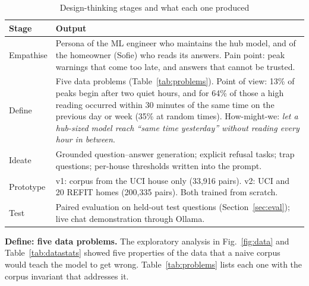 \documentclass[conference]{IEEEtran}
\begin{document}
\begin{table}[t]
\caption{Design-thinking stages and what each one produced}
\label{tab:dt}
\centering
\footnotesize
\begin{tabular}{@{}p{1.45cm}p{6.95cm}@{}}
\toprule
Stage & Output \\
\midrule
Empathise & Persona of the ML engineer who maintains the hub model, and of the homeowner (Sofie) who reads its answers. Pain point: peak warnings that come too late, and answers that cannot be trusted. \\
Define & Five data problems (Table~\ref{tab:problems}). Point of view: 13\% of peaks begin after two quiet hours, and for 64\% of those a high reading occurred within 30 minutes of the same time on the previous day or week (35\% at random times). How-might-we: \emph{let a hub-sized model reach ``same time yesterday'' without reading every hour in between}. \\
Ideate & Grounded question--answer generation; explicit refusal tasks; trap questions; per-house thresholds written into the prompt. \\
Prototype & v1: corpus from the UCI house only (33{,}916 pairs). v2: UCI and 20 REFIT homes (200{,}335 pairs). Both trained from scratch. \\
Test & Paired evaluation on held-out test questions (Section~\ref{sec:eval}); live chat demonstration through Ollama. \\
\bottomrule
\end{tabular}
\end{table}

\textbf{Define: five data problems.} The exploratory analysis in Fig.~\ref{fig:data} and Table~\ref{tab:datastats}
showed five properties of the data that a naive corpus would teach the model to get wrong. Table~\ref{tab:problems}
lists each one with the corpus invariant that addresses it.
\end{document}
